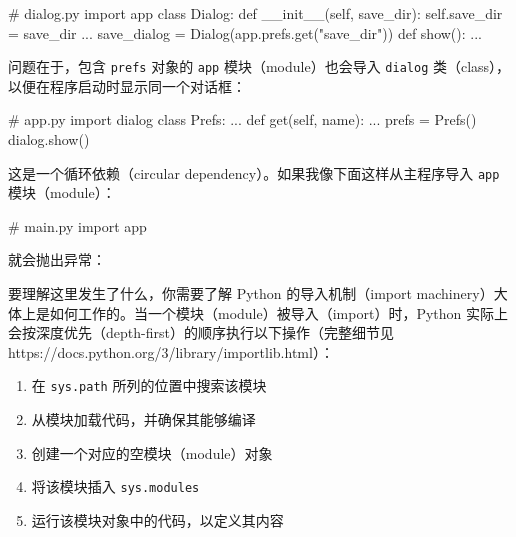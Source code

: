 \begin{codebox}[python]
# dialog.py
import app
class Dialog:
    def __init__(self, save_dir):
        self.save_dir = save_dir
    ...
save_dialog = Dialog(app.prefs.get("save_dir"))
def show():
    ...
\end{codebox}

问题在于，包含 \texttt{prefs} 对象的 \texttt{app} 模块（module）也会导入 \texttt{dialog} 类（class），以便在程序启动时显示同一个对话框：

\begin{codebox}[python]
# app.py
import dialog
class Prefs:
    ...
    def get(self, name):
        ...
prefs = Prefs()
dialog.show()
\end{codebox}

这是一个循环依赖（circular dependency）。如果我像下面这样从主程序导入 \texttt{app} 模块（module）：

\begin{codebox}[python]
# main.py
import app
\end{codebox}

就会抛出异常：


要理解这里发生了什么，你需要了解 Python 的导入机制（import machinery）大体上是如何工作的。当一个模块（module）被导入（import）时，Python 实际上会按深度优先（depth-first）的顺序执行以下操作（完整细节见 https://docs.python.org/3/library/importlib.html）：

\begin{enumerate}
\item 在 \texttt{sys.path} 所列的位置中搜索该模块
\item 从模块加载代码，并确保其能够编译
\item 创建一个对应的空模块（module）对象
\item 将该模块插入 \texttt{sys.modules}
\item 运行该模块对象中的代码，以定义其内容
\end{enumerate}

